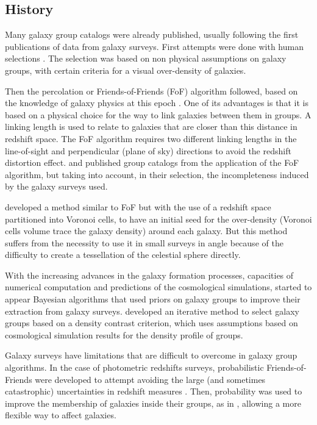 \subsection{History}
\label{sub:history}

Many galaxy group catalogs were already published, usually following the first
publications of data from galaxy surveys. First attempts were done with human
selections \citep{Abell+58,Zwicky+61,Rose+76}. The selection was based on non
physical assumptions on galaxy groups, with certain criteria for a visual
over-density of galaxies.

Then the percolation or Friends-of-Friends (FoF) algorithm followed, based on
the knowledge of galaxy physics at this epoch \citep{Huchra+82,Nolthenius+87}.
One of its advantages is that it is based on a physical choice for the way to
link galaxies between them in groups. A linking length is used to relate to
galaxies that are closer than this distance in redshift space. The FoF
algorithm requires two different linking lengths in the line-of-sight and
perpendicular (plane of sky) directions to avoid the redshift distortion
effect. \citet{Eke+04} and \citet{Berlind+06} published group catalogs from the
application of the FoF algorithm, but taking into account, in their selection,
the incompleteness induced by the galaxy surveys used.

\citet{Marinoni+02} developed a method similar to FoF but with the use of a
redshift space partitioned into Voronoi cells, to have an initial seed for the
over-density (Voronoi cells volume trace the galaxy density) around each
galaxy. But this method suffers from the necessity to use it in small surveys
in angle because of the difficulty to create a tessellation of the celestial
sphere directly.

With the increasing advances in the galaxy formation processes, capacities of
numerical computation and predictions of the cosmological simulations, started
to appear Bayesian algorithms that used priors on galaxy groups to improve
their extraction from galaxy surveys. \citet{Yang+05,Yang+07} developed an
iterative method to select galaxy groups based on a density contrast criterion,
which uses assumptions based on cosmological simulation results for the density
profile of groups.

Galaxy surveys have limitations that are difficult to overcome in galaxy group
algorithms. In the case of photometric redshifts surveys, probabilistic
Friends-of-Friends were developed to attempt avoiding the large (and sometimes
catastrophic) uncertainties in redshift measures \citep{Liu+08}. Then,
probability was used to improve the membership of galaxies inside their groups,
as in \citet{DominguezRomero+12}, allowing a more flexible way to affect
galaxies.


